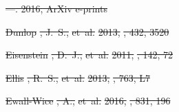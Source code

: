 \documentclass[numberedappendix]{emulateapj}
\providecommand{\DIFdel}[1]{{\protect\color{red}\sout{#1}}}                      %
\begin{document}
\DIFdel{---. 2016, ArXiv e-prints
}%

\DIFdel{Dunlop}%
\DIFdel{, J.~S., }%
\DIFdel{et~al.}%
\DIFdel{2013, }%
\DIFdel{, 432, 3520
}%

\DIFdel{Eisenstein}%
\DIFdel{, D.~J., }%
\DIFdel{et~al.}%
\DIFdel{2011, }%
\DIFdel{, 142, 72
}%

\DIFdel{Ellis}%
\DIFdel{, R.~S., }%
\DIFdel{et~al.}%
\DIFdel{2013, }%
\DIFdel{, 763, L7
}%

\DIFdel{Ewall-Wice}%
\DIFdel{, A., }%
\DIFdel{et~al.}%
\DIFdel{2016, }%
\DIFdel{, 831, 196
}%
\end{document}
